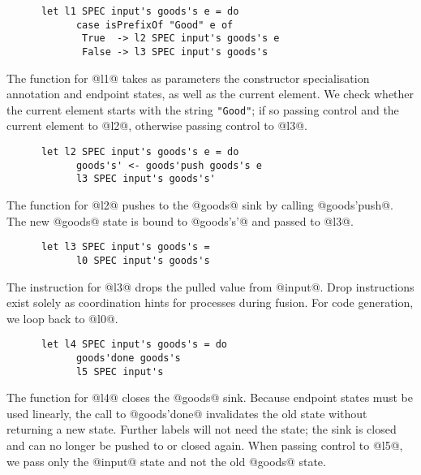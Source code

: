 \begin{lstlisting}
      let l1 SPEC input's goods's e = do
            case isPrefixOf "Good" e of
             True  -> l2 SPEC input's goods's e
             False -> l3 SPEC input's goods's
\end{lstlisting}

The function for @l1@ takes as parameters the constructor specialisation annotation and endpoint states, as well as the current element.
We check whether the current element starts with the string \lstinline/"Good"/; if so passing control and the current element to @l2@, otherwise passing control to @l3@.

\begin{lstlisting}
      let l2 SPEC input's goods's e = do
            goods's' <- goods'push goods's e
            l3 SPEC input's goods's'
\end{lstlisting}

The function for @l2@ pushes to the @goods@ sink by calling @goods'push@.
The new @goods@ state is bound to @goods's'@ and passed to @l3@.

\begin{lstlisting}
      let l3 SPEC input's goods's =
            l0 SPEC input's goods's
\end{lstlisting}

The instruction for @l3@ drops the pulled value from @input@.
Drop instructions exist solely as coordination hints for processes during fusion.
For code generation, we loop back to @l0@.

\begin{lstlisting}
      let l4 SPEC input's goods's = do
            goods'done goods's
            l5 SPEC input's
\end{lstlisting}

The function for @l4@ closes the @goods@ sink.
Because endpoint states must be used linearly, the call to @goods'done@ invalidates the old state without returning a new state.
Further labels will not need the state; the sink is closed and can no longer be pushed to or closed again.
When passing control to @l5@, we pass only the @input@ state and not the old @goods@ state.

% 

